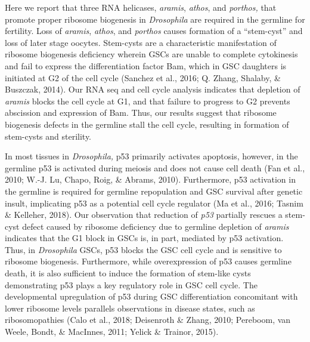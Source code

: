 \documentclass[12pt,oneside]{reedthesis}
\begin{document}
Here we report that three RNA helicases, \emph{aramis}, \emph{athos}, and \emph{porthos,} that promote proper ribosome biogenesis in \emph{Drosophila} are required in the germline for fertility. Loss of \emph{aramis}, \emph{athos}, and \emph{porthos} causes formation of a ``stem-cyst'' and loss of later stage oocytes. Stem-cysts are a characteristic manifestation of ribosome biogenesis deficiency wherein GSCs are unable to complete cytokinesis and fail to express the differentiation factor Bam, which in GSC daughters is initiated at G2 of the cell cycle (Sanchez et al., 2016; Q. Zhang, Shalaby, \& Buszczak, 2014). Our RNA seq and cell cycle analysis indicates that depletion of \emph{aramis} blocks the cell cycle at G1, and that failure to progress to G2 prevents abscission and expression of Bam. Thus, our results suggest that ribosome biogenesis defects in the germline stall the cell cycle, resulting in formation of stem-cysts and sterility.

In most tissues in \emph{Drosophila,} p53 primarily activates apoptosis, however, in the germline p53 is activated during meiosis and does not cause cell death (Fan et al., 2010; W.-J. Lu, Chapo, Roig, \& Abrams, 2010). Furthermore, p53 activation in the germline is required for germline repopulation and GSC survival after genetic insult, implicating p53 as a potential cell cycle regulator (Ma et al., 2016; Tasnim \& Kelleher, 2018). Our observation that reduction of \emph{p53} partially rescues a stem-cyst defect caused by ribosome deficiency due to germline depletion of \emph{aramis} indicates that the G1 block in GSCs is, in part, mediated by p53 activation. Thus, in \emph{Drosophila} GSCs, p53 blocks the GSC cell cycle and is sensitive to ribosome biogenesis. Furthermore, while overexpression of p53 causes germline death, it is also sufficient to induce the formation of stem-like cysts demonstrating p53 plays a key regulatory role in GSC cell cycle. The developmental upregulation of p53 during GSC differentiation concomitant with lower ribosome levels parallels observations in disease states, such as ribosomopathies (Calo et al., 2018; Deisenroth \& Zhang, 2010; Pereboom, van Weele, Bondt, \& MacInnes, 2011; Yelick \& Trainor, 2015).
\end{document}
